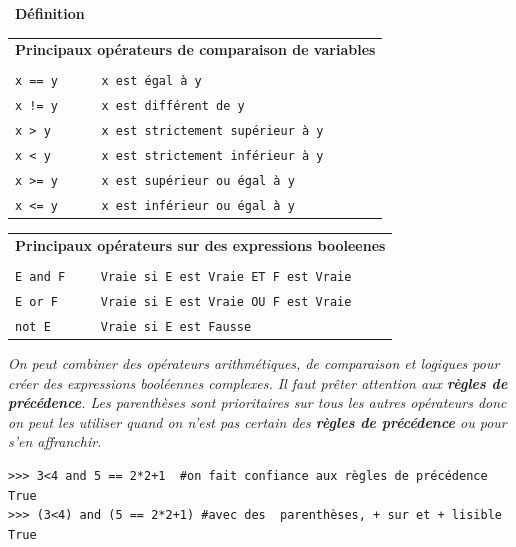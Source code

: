 \documentclass[a4paper, french, 12pt]{article}  %
\newcounter{def}
\newenvironment{definition}[1]
{\par \medskip   \addtocounter{def}{1} \noindent  
\begin{bclogo}[arrondi =0.1,  ombre = true, barre=none, logo=\bcbook, marge=4]{~\textbf{Définition} \textbf{\thedef} {\itshape #1} }  \par}
{
\end{bclogo}
 \par \bigskip }
\newcounter{logi}
\begin{document}
\begin{definition}{}
\begin{center}
\begin{tabular}{lcl}
\hline
\multicolumn{3}{c}{\textbf{Principaux opérateurs de comparaison de variables}} \\
& & \\
\texttt{x == y} &  & \texttt{x est égal à y} \\
\texttt{x != y} &  & \texttt{x est différent de y} \\
\texttt{x > y} &  & \texttt{x est strictement supérieur à y} \\
\texttt{x < y} &  & \texttt{x est strictement inférieur à y} \\
\texttt{x >= y} & & \texttt{x est  supérieur ou égal à y} \\
\texttt{x <= y} &  & \texttt{x est  inférieur ou égal à y} \\
\hline
\end{tabular}

\begin{tabular}{lcl}
\hline
\multicolumn{3}{c}{\textbf{Principaux opérateurs  sur des expressions booleenes}} \\
& & \\
\texttt{E and F} & & \texttt{Vraie si E est Vraie ET F est Vraie}\\
\texttt{E or F} & & \texttt{Vraie si E est Vraie OU F est Vraie }\\
\texttt{not E} &  & \texttt{Vraie si E est Fausse}\\
\hline
\end{tabular}
\end{center} 

{\itshape
\bcattention{} On peut combiner des opérateurs arithmétiques,  de comparaison  et logiques pour créer des expressions booléennes complexes. Il faut prêter attention aux \textbf{règles de précédence}. Les parenthèses sont prioritaires sur tous les autres opérateurs donc on peut les utiliser quand on n'est pas certain  des  \textbf{règles de précédence} ou pour s'en affranchir.

\begin{lstlisting}[style=compil]
>>> 3<4 and 5 == 2*2+1  #on fait confiance aux règles de précédence
True
>>> (3<4) and (5 == 2*2+1) #avec des  parenthèses, + sur et + lisible
True
\end{lstlisting}
}
\end{definition}
\end{document}
